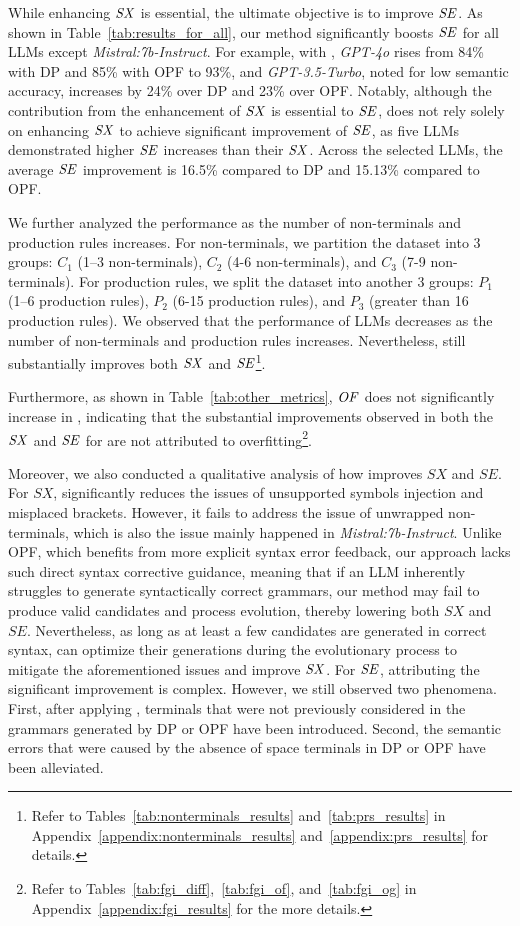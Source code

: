 While enhancing $\mathit{SX}$ is essential, the ultimate objective is to improve $\mathit{SE}$. As shown in Table~\ref{tab:results_for_all}, our method significantly boosts $\mathit{SE}$ for all LLMs except \textit{Mistral:7b-Instruct}. For example, with \NAME, \textit{GPT-4o} rises from 84\% with DP and 85\% with OPF to 93\%, and \textit{GPT-3.5-Turbo}, noted for low semantic accuracy, increases by 24\% over DP and 23\% over OPF. Notably, although the contribution from the enhancement of $\mathit{SX}$ is essential to $\mathit{SE}$, \NAME does not rely solely on enhancing $\mathit{SX}$ to achieve significant improvement of $\mathit{SE}$, as five LLMs demonstrated higher $\mathit{SE}$ increases than their $\mathit{SX}$. Across the selected LLMs, the average $\mathit{SE}$ improvement is 16.5\% compared to DP and 15.13\% compared to OPF. 

We further analyzed the performance as the number of non-terminals and production rules increases. For non-terminals, we partition the dataset into 3 groups: $C_1$ (1–3 non-terminals), $C_2$ (4-6 non-terminals), and $C_3$ (7-9 non-terminals). For production rules, we split the dataset into another 3 groups: $P_1$ (1–6 production rules), $P_2$ (6-15 production rules), and $P_3$ (greater than 16 production rules). We observed that the performance of LLMs decreases as the number of non-terminals and production rules increases. Nevertheless, \NAME still substantially improves both $\mathit{SX}$ and $\mathit{SE}$\footnote{Refer to Tables~\ref{tab:nonterminals_results} and~\ref{tab:prs_results} in Appendix~\ref{appendix:nonterminals_results} and~\ref{appendix:prs_results} for details.}.

Furthermore, as shown in Table~\ref{tab:other_metrics}, $\mathit{OF}$ does not significantly increase in \NAME, indicating that the substantial improvements observed in both the $\mathit{SX}$ and $\mathit{SE}$ for \NAME are not attributed to overfitting\footnote{Refer to Tables~\ref{tab:fgi_diff},~\ref{tab:fgi_of}, and~\ref{tab:fgi_og} in Appendix~\ref{appendix:fgi_results} for the more details.}.

Moreover, we also conducted a qualitative analysis of how \NAME improves $SX$ and $SE$. For $SX$, \NAME significantly reduces the issues of unsupported symbols injection and misplaced brackets. However, it fails to address the issue of unwrapped non-terminals, which is also the issue mainly happened in \textit{Mistral:7b-Instruct}. Unlike OPF, which benefits from more explicit syntax error feedback, our approach lacks such direct syntax corrective guidance, meaning that if an LLM inherently struggles to generate syntactically correct grammars, our method may fail to produce valid candidates and process evolution, thereby lowering both $SX$ and $SE$. Nevertheless, as long as at least a few candidates are generated in correct syntax, \NAME can optimize their generations during the evolutionary process to mitigate the aforementioned issues and improve $\mathit{SX}$. For $\mathit{SE}$, attributing the significant improvement is complex. However, we still observed two phenomena. First, after applying \NAME, terminals that were not previously considered in the grammars generated by DP or OPF have been introduced. Second, the semantic errors that were caused by the absence of space terminals in DP or OPF have been alleviated.

